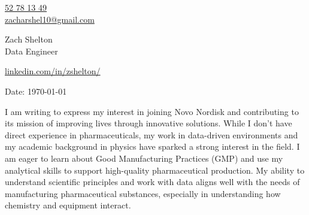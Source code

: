 \documentclass[11pt,a4]{article}
\begin{document}
\begin{center}
    \begin{minipage}[b]{0.24\textwidth}
            \large \href{tel:52 78 13 49}{52 78 13 49} \\
            \large \href{mailto:zacharshel10@gmail.com}{zacharshel10@gmail.com} 
    \end{minipage}%
    \begin{minipage}[b]{0.5\textwidth}
            \centering
            {\Huge Zach Shelton} \\ %
            \vspace{0.1cm}
            {\color{UI_blue} \Large{Data Engineer}} \\
    \end{minipage}%
    \begin{minipage}[b]{0.24\textwidth}
            \flushright \large
            {\href{https://www.linkedin.com/in/zshelton/}{linkedin.com/in/zshelton/} } \\

    \end{minipage}   
    
\vspace{-0.15cm} 
{\color{UI_blue} \hrulefill}
\end{center}

\justify
\setlength{\parindent}{0pt}
\setlength{\parskip}{12pt}
\vspace{0.1cm}


Date: \today \par \vspace{-0.1cm}

I am writing to express my interest in joining Novo Nordisk and contributing to its mission of improving lives through innovative solutions. While I don’t have direct experience in pharmaceuticals, my work in data-driven environments and my academic background in physics have sparked a strong interest in the field. I am eager to learn about Good Manufacturing Practices (GMP) and use my analytical skills to support high-quality pharmaceutical production. My ability to understand scientific principles and work with data aligns well with the needs of manufacturing pharmaceutical substances, especially in understanding how chemistry and equipment interact.
\end{document}

